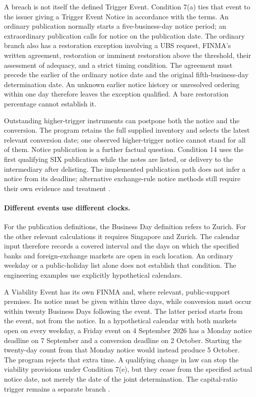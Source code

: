A breach is not itself the defined Trigger Event. Condition 7(a) ties that
event to the issuer giving a Trigger Event Notice in accordance with the
terms. An ordinary publication normally starts a five-business-day notice
period; an extraordinary publication calls for notice on the publication
date. The ordinary branch also has a restoration exception involving a UBS
request, FINMA's written agreement, restoration or imminent restoration above
the threshold, their assessment of adequacy, and a strict timing condition.
The agreement must precede the earlier of the ordinary notice date and the
original fifth-business-day determination date. An unknown earlier notice
history or unresolved ordering within one day therefore leaves the exception
qualified. A bare restoration percentage cannot establish it.

Outstanding higher-trigger instruments can postpone both the notice and the
conversion. The program retains the full supplied inventory and selects the
latest relevant conversion date; one observed higher-trigger notice cannot
stand for all of them. Notice publication is a further factual question.
Condition 14 uses the first qualifying SIX publication while the notes are
listed, or delivery to the intermediary after delisting. The implemented
publication path does not infer a notice from its deadline; alternative
exchange-rule notice methods still require their own evidence and treatment
\citep[conditions~7(a)--(b), 14]{ubsat12024}.

\paragraph{Different events use different clocks.}
For the publication definitions, the Business Day definition refers to Zurich.
For the other relevant calculations it requires Singapore and Zurich.
The calendar input therefore records a covered interval and the days on which
the specified banks and foreign-exchange markets are open in each location.
An ordinary weekday or a public-holiday list alone does not establish that
condition. The engineering examples use explicitly hypothetical calendars.

A Viability Event has its own FINMA and, where relevant, public-support
premises. Its notice must be given within three days, while conversion must
occur within twenty Business Days following the event. The latter period
starts from the event, not from the notice. In a hypothetical calendar with
both markets open on every weekday, a Friday event on 4 September 2026 has a
Monday notice deadline on 7 September and a conversion deadline on 2 October.
Starting the twenty-day count from that Monday notice would instead produce
5 October. The program rejects that extra time. A qualifying change in law
can stop the viability provisions under Condition 7(e), but they cease from
the specified actual notice date, not merely the date of the joint
determination. The capital-ratio trigger remains a separate branch
\citep[Business Day definition; conditions~7(c), 7(e)]{ubsat12024}.


